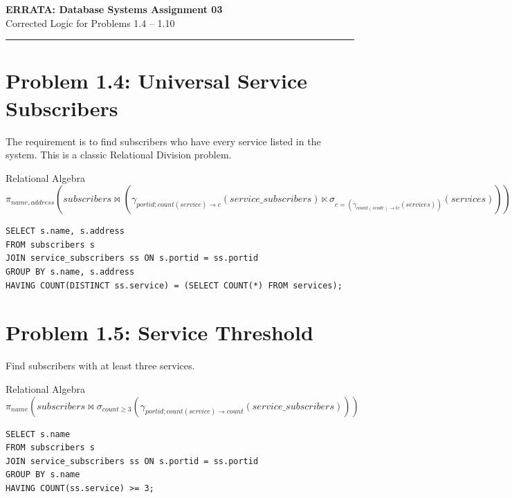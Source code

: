 \documentclass[12pt]{article}
\begin{document}
\begin{center}
    {\Huge \textbf{ERRATA: Database Systems Assignment 03}} \\
    \vspace{0.5em}
    {\LARGE Corrected Logic for Problems 1.4 -- 1.10} \\
    \vspace{1em}
    \hrule
    \vspace{-0.5em}
\end{center}
\thispagestyle{empty}

\section{Problem 1.4: Universal Service Subscribers}
The requirement is to find subscribers who have every service listed in the system. This is a classic Relational Division problem.

\begin{raguery}{Relational Algebra}
    {\fontsize{12pt}{2pt}\selectfont $\pi_{name, address}(subscribers \bowtie (\gamma_{portid; count(service) \to c}(service\_subscribers) \ltimes \sigma_{c = (\gamma_{count(scode) \to tc}(services))}(services)))$}
\end{raguery}

\begin{lstlisting}
SELECT s.name, s.address
FROM subscribers s
JOIN service_subscribers ss ON s.portid = ss.portid
GROUP BY s.name, s.address
HAVING COUNT(DISTINCT ss.service) = (SELECT COUNT(*) FROM services);
\end{lstlisting}

\section{Problem 1.5: Service Threshold}
Find subscribers with at least three services.

\begin{raguery}{Relational Algebra}
    {\small $\pi_{name}(subscribers \bowtie \sigma_{count \ge 3}(\gamma_{portid; count(service) \to count}(service\_subscribers)))$}
\end{raguery}

\begin{lstlisting}
SELECT s.name
FROM subscribers s
JOIN service_subscribers ss ON s.portid = ss.portid
GROUP BY s.name
HAVING COUNT(ss.service) >= 3;
\end{lstlisting}
\end{document}
